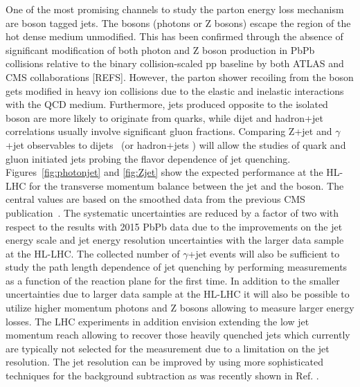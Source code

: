 One of the most promising channels to study the parton energy loss mechanism are boson tagged jets. The bosons (photons or Z bosons) escape the region of the hot dense medium unmodified. This has been confirmed through the absence of significant modification of both photon and Z boson production in PbPb collisions relative to the binary collision-scaled pp baseline by both ATLAS and CMS collaborations [REFS]. However, the parton shower recoiling from the boson gets modified in heavy ion collisions due to the elastic and inelastic interactions with the QCD medium. Furthermore, jets produced opposite to the isolated boson
are more likely to originate from quarks, while dijet and hadron+jet correlations usually involve significant gluon fractions. 
Comparing Z+jet and $\gamma$+jet observables to dijets~\cite{Chatrchyan:2011sx,Chatrchyan:2012nia} (or hadron+jets \cite{Adam:2015doa}) will allow the studies of quark and gluon initiated jets probing the flavor dependence of jet quenching. Figures~\ref{fig:photonjet} and \ref{fig:Zjet} show the expected performance at the HL-LHC for the transverse momentum balance between the jet and the boson. The central values are based on the smoothed data from the previous CMS publication~\cite{Sirunyan:2017jic,Sirunyan:2017qhf}. The systematic uncertainties are reduced by a factor of two with respect to the results with 2015 PbPb data due to the improvements on the jet energy scale and jet energy resolution uncertainties with the larger data sample at the HL-LHC. The collected number of $\gamma$+jet events will also be sufficient to study the path length dependence of jet quenching by performing measurements as a function of the reaction plane for the first time. In addition to the smaller uncertainties due to larger data sample at the HL-LHC it will also be possible to utilize higher momentum photons and Z bosons allowing to measure larger energy losses. The LHC experiments in addition envision extending the low jet momentum reach allowing to recover those heavily quenched jets  which currently are typically not selected for the measurement due to a limitation on the jet resolution. The jet resolution can be improved by using more sophisticated techniques for the background subtraction as was recently shown in Ref. \cite{Haake:2018hqn}.

